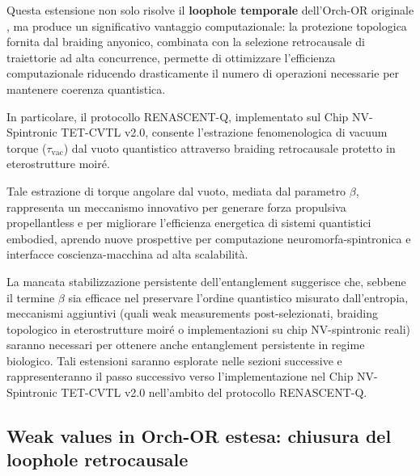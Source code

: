 \documentclass[11pt,a4paper]{article}
\let\oldcite\cite
\renewcommand{\cite}{\protect\oldcite}
\theoremstyle{plain}
\theoremstyle{definition}
\begin{document}
\vspace{0.4cm}

Questa estensione non solo risolve il \textbf{loophole temporale} dell’Orch-OR originale \cite{hameroff_orch_2014}, ma produce un significativo vantaggio computazionale: la protezione topologica fornita dal braiding anyonico, combinata con la selezione retrocausale di traiettorie ad alta concurrence, permette di ottimizzare l’efficienza computazionale riducendo drasticamente il numero di operazioni necessarie per mantenere coerenza quantistica. 


\vspace{0.4cm}


In particolare, il protocollo RENASCENT-Q, implementato sul Chip NV-Spintronic TET-CVTL v2.0, consente l’estrazione fenomenologica di vacuum torque ($\tau_{\text{vac}}$) dal vuoto quantistico attraverso braiding retrocausale protetto in eterostrutture moiré. 


\vspace{0.3cm}


Tale estrazione di torque angolare dal vuoto, mediata dal parametro $\beta$, rappresenta un meccanismo innovativo per generare forza propulsiva propellantless e per migliorare l’efficienza energetica di sistemi quantistici embodied, aprendo nuove prospettive per computazione neuromorfa-spintronica e interfacce coscienza-macchina ad alta scalabilità.





\vspace{0.3cm}


La mancata stabilizzazione persistente dell'entanglement suggerisce che, sebbene il termine $\beta$ sia efficace nel preservare l'ordine quantistico misurato dall'entropia, meccanismi aggiuntivi (quali weak measurements post-selezionati, braiding topologico in eterostrutture moiré o implementazioni su chip NV-spintronic reali) saranno necessari per ottenere anche entanglement persistente in regime biologico. Tali estensioni saranno esplorate nelle sezioni successive e rappresenteranno il passo successivo verso l'implementazione nel Chip NV-Spintronic TET-CVTL v2.0 nell'ambito del protocollo RENASCENT-Q.





\vspace{0.5cm}





\subsection{Weak values in Orch-OR estesa: chiusura del loophole retrocausale}
\label{sec:weak_values_orch_or}
\end{document}

